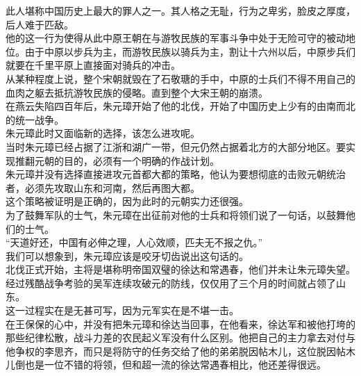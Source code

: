 \begin{multicols}{\theparacolNo}
此人堪称中国历史上最大的罪人之一。其人格之无耻，行为之卑劣，脸皮之厚度，后人难于匹敌。\\

他的这一行为使得从此中原王朝在与游牧民族的军事斗争中处于无险可守的被动地位。由于中原以步兵为主，而游牧民族以骑兵为主，割让十六州以后，中原步兵们就要在千里平原上直接面对骑兵的冲击。\\

从某种程度上说，整个宋朝就毁在了石敬瑭的手中，中原的士兵们不得不用自己的血肉之躯去抵抗游牧民族的侵略。直到整个大宋王朝的崩溃。\\

在燕云失陷四百年后，朱元璋开始了他的北伐，开始了中国历史上少有的由南而北的统一战争。\\

朱元璋此时又面临新的选择，该怎么进攻呢。\\

当时朱元璋已经占据了江浙和湖广一带，但元仍然占据着北方的大部分地区。要实现推翻元朝的目的，必须有一个明确的作战计划。\\

朱元璋并没有选择直接进攻元首都大都的策略，他认为要想彻底的击败元朝统治者，必须先攻取山东和河南，然后再图大都。\\

这个策略被证明是正确的，因为此时的元朝实力还很强。\\

为了鼓舞军队的士气，朱元璋在出征前对他的士兵和将领们说了一句话，以鼓舞他们的士气。\\

“天道好还，中国有必伸之理，人心效顺，匹夫无不报之仇。”\\

我们可以想象到，朱元璋应该是咬牙切齿说出这句话的。\\

北伐正式开始，主将是堪称明帝国双璧的徐达和常遇春，他们并未让朱元璋失望。经过残酷战争考验的吴军连续攻破元的防线，仅仅用了三个月的时间就占领了山东。\\

这一过程实在是无甚可写，因为元军实在是不堪一击。\\

在王保保的心中，并没有把朱元璋和徐达当回事，在他看来，徐达军和被他打垮的那些纪律松散，战斗力差的农民起义军没有什么区别。他把自己的主力拿去对付与他争权的李思齐，而只是将防守的任务交给了他的弟弟脱因帖木儿，这位脱因帖木儿倒也是一位不错的将领，但和超一流的徐达常遇春相比，他还差得很远。\\


\end{multicols}
